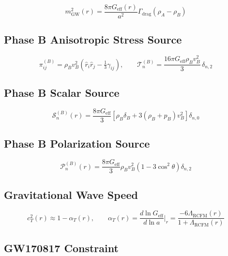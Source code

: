 \documentclass[10pt,twocolumn]{article}
\theoremstyle{definition}
\newcommand{\rhoA}{\rho_{A}}
\newcommand{\rhoB}{\rho_{B}}
\newcommand{\Geff}{G_{\mathrm{eff}}}
\newcommand{\Gammadrag}{\Gamma_{\mathrm{drag}}}
\begin{document}
\begin{equation}
  m_{\mathrm{GW}}^{2}(r)
    = \frac{8\pi\Geff(r)}{a^{2}}
      \Gammadrag(\rhoA-\rhoB)
  \label{eq:mGW}
\end{equation}%


\subsection{Phase B Anisotropic Stress Source}


\begin{equation}
  \pi^{(B)}_{ij}
    = \rhoB v_{B}^{2}
      \!\left(\hat{r}_{i}\hat{r}_{j}
             -\tfrac{1}{3}\gamma_{ij}\right),
    \qquad
    \mathcal{T}_{n}^{(B)}
    = \frac{16\pi\Geff\rhoB v_{B}^{2}}{3}\,\delta_{n,2}
  \label{eq:T-B-GW}
\end{equation}

\subsection{Phase B Scalar Source}


\begin{equation}
  \mathcal{S}_{n}^{(B)}(r)
    = \frac{8\pi\Geff}{3}
      \left[\rhoB\delta_{B}
            + 3(\rhoB + p_{B})v_{B}^{2}\right]
      \delta_{n,0}
  \label{eq:S_B}
\end{equation}


\subsection{Phase B Polarization Source}


\begin{equation}
  \mathcal{P}_{n}^{(B)}(r)
    = \frac{8\pi\Geff}{3}
      \rhoB v_{B}^{2}
      \left(1-3\cos^{2}\theta\right)
      \delta_{n,2}
  \label{eq:P-B}
\end{equation}


\subsection{Gravitational Wave Speed}

\begin{equation}
  c_{T}^{2}(r)
    \approx 1-\alpha_{T}(r),
  \qquad
  \alpha_{T}(r)
    = \frac{d\ln\Geff}{d\ln a}\bigg|_{r}
    = \frac{-6\Lambda_{\mathrm{RCFM}}(r)}
           {1+\Lambda_{\mathrm{RCFM}}(r)}
  \label{eq:cT}
\end{equation}

\subsection{GW170817 Constraint}
\end{document}
